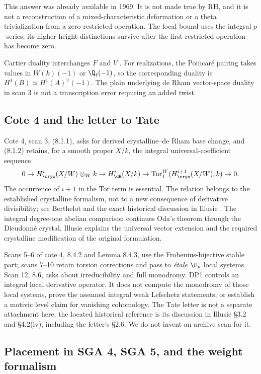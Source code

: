 \documentclass[11pt,a4paper]{article}
\theoremstyle{definition}\newtheorem{remark}[theorem]{Remark}
\begin{document}
This answer was already available in 1969. It is not made true by RH, and it is not a reconstruction of a mixed-characteristic deformation or a theta trivialization from a zero restricted operation. The local bound uses the integral $p$-series; its higher-height distinctions survive after the first restricted operation has become zero.

Cartier duality interchanges $F$ and $V$ \cite[Theorem 3.19, p.~89]{Oda}. For realizations, the Poincar\'e pairing takes values in $W(k)(-1)$ or $\Q_\ell(-1)$, so the corresponding duality is $H^1(B)\simeq H^1(A)^\vee(-1)$. The plain underlying de Rham vector-space duality in scan 3 is not a transcription error requiring an added twist.

\subsection{Cote 4 and the letter to Tate}

Cote 4, scan 3, (8.1.1), asks for derived crystalline--de Rham base change, and (8.1.2) retains, for a smooth proper $X/k$, the integral universal-coefficient sequence
\[
 0\to H^i_\crys(X/W)\otimes_Wk\to H^i_\dR(X/k)
 \to\operatorname{Tor}_1^W(H^{i+1}_\crys(X/W),k)\to0.
\]
The occurrence of $i+1$ in the Tor term is essential. The relation belongs to the established crystalline formalism, not to a new consequence of derivative divisibility; see Berthelot \cite[V.3.6]{Berthelot} and the exact historical discussion in Illusie \cite[\S3.2, pp.~9--11]{Illusie}. The integral degree-one abelian comparison continues Oda's theorem through the Dieudonn\'e crystal. Illusie \cite[\S4.2(iv), pp.~16--17]{Illusie} explains the universal vector extension and the required crystalline modification of the original formulation.

Scans 5--6 of cote 4, 8.4.2 and Lemma 8.4.3, use the Frobenius-bijective stable part; scans 7--10 retain torsion corrections and pass to \emph{\'etale} $\F_p$ local systems. Scan 12, 8.6, asks about irreducibility and full monodromy. DP1 controls an integral local derivative operator. It does not compute the monodromy of those local systems, prove the assumed integral weak Lefschetz statements, or establish a motivic level claim for vanishing cohomology. The Tate letter is not a separate attachment here; the located historical reference is its discussion in Illusie \S3.2 and \S4.2(iv), including the letter's \S2.6. We do not invent an archive scan for it.

\subsection{Placement in SGA 4, SGA 5, and the weight formalism}
\end{document}
